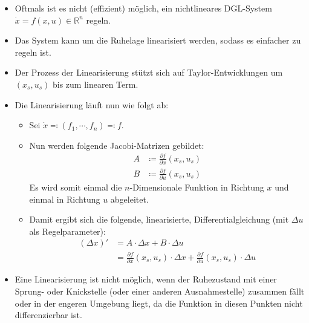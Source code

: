 \documentclass[a4paper, 11pt, accentcolor = tud3b]{tudreport}
\begin{document}
                \begin{itemize}
                	\item Oftmals ist es nicht (effizient) möglich, ein nichtlineares DGL-System \( \dot{x} = f(x, u) \in \mathbb{R} ^ n \) regeln.
                	\item Das System kann um die Ruhelage linearisiert werden, sodass es einfacher zu regeln ist.
                	\item Der Prozess der Linearisierung stützt sich auf Taylor-Entwicklungen um \( (x _ s, u _ s) \) bis zum linearen Term.
                	\item Die Linearisierung läuft nun wie folgt ab:
	                	\begin{itemize}
	                		\item Sei \( \dot{x} \eqqcolon (f _ 1, \cdots, f _ n) \eqqcolon f \).
	                		\item Nun werden folgende Jacobi-Matrizen gebildet:
		                		\begin{align*}
			                		A &\coloneqq \frac{\partial f}{\partial x} (x _ s, u _ s) \\
			                		B &\coloneqq \frac{\partial f}{\partial u} (x _ s, u _ s)
		                		\end{align*}
		                		Es wird somit einmal die \(n\)-Dimensionale Funktion in Richtung \(x\) und einmal in Richtung \(u\) abgeleitet.
		                	\item Damit ergibt sich die folgende, linearisierte, Differentialgleichung (mit \( \Delta u \) als Regelparameter):
			                	\begin{align*}
				                	{(\Delta x)}' &= A \cdot \Delta x + B \cdot \Delta u \\
				                	              &= \frac{\partial f}{\partial x} (x _ s, u _ s) \cdot \Delta x + \frac{\partial f}{\partial u} (x _ s, u _ s) \cdot \Delta u
			                	\end{align*}
		                \end{itemize}
		            \item Eine Linearisierung ist nicht möglich, wenn der Ruhezustand mit einer Sprung- oder Knickstelle (oder einer anderen Ausnahmestelle) zusammen fällt oder in der engeren Umgebung liegt, da die Funktion in diesen Punkten nicht differenzierbar ist.
                \end{itemize}
\end{document}
